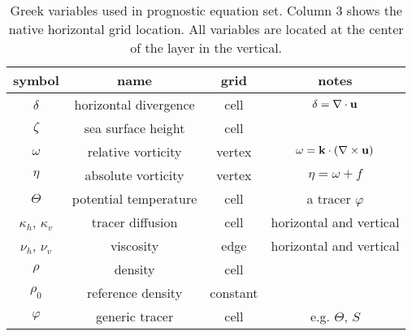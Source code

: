 \begin{table}[ht] 
\caption{Greek variables used in prognostic equation set.  Column 3 shows the native horizontal grid location.  All variables are located at the center of the layer in the vertical.} 
\vspace{0.5cm} \centering 
\begin{tabular}{c c c c} 
\hline\hline symbol &  name & grid & notes  \\
\hline 
$\delta$ & horizontal divergence & cell  & $\delta=\nabla\cdot{\bf u}$  \\
$\zeta$ & sea surface height & cell   \\
$\omega$ & relative vorticity & vertex & $\omega={\bf k} \cdot \left( \nabla \times {\bf u} \right)$\\
$\eta$ & absolute vorticity & vertex  & $\eta=\omega+f$ \\
$\Theta$ & potential temperature & cell  & a tracer $\varphi$ \\
$\kappa_h$, $\kappa_v$ & tracer diffusion & cell & horizontal and vertical \\ 
$\nu_h$, $\nu_v$ & viscosity & edge & horizontal and vertical \\
$\rho$ & density & cell  \\
$\rho_0$ & reference density & constant & \\
$\varphi$ & generic tracer & cell & e.g. $\Theta$, $S$ \\
\hline 
\end{tabular} \label{oceanTable:variables_Greek} 
\end{table}
